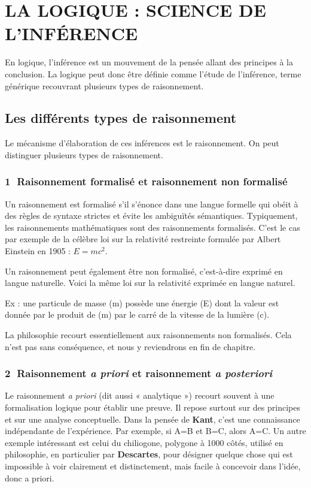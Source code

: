 \section{LA LOGIQUE : SCIENCE DE L’INFÉRENCE}
En logique, l’inférence est un mouvement de la pensée allant des principes à la conclusion. La logique peut donc être définie comme l’étude de l’inférence, terme générique recouvrant plusieurs types de raisonnement.

\subsection{Les différents types de raisonnement}
Le mécanisme d’élaboration de ces inférences est le raisonnement. On peut distinguer plusieurs types de raisonnement.

\subsubsection*{\textcircled{\scriptsize 1} Raisonnement formalisé et raisonnement non formalisé}
Un raisonnement est formalisé s’il s’énonce dans une langue formelle qui obéit à des règles
de syntaxe strictes et évite les ambiguïtés sémantiques. Typiquement, les raisonnements mathématiques sont des raisonnements formalisés. C’est le cas par exemple de la célèbre loi sur la relativité restreinte formulée par Albert Einstein en 1905 : $E=mc^2$.

Un raisonnement peut également être non formalisé, c’est-à-dire exprimé en langue naturelle. Voici la même loi sur la relativité exprimée en langue naturel.

Ex : une particule de masse (m) possède une énergie (E) dont la valeur est donnée par le produit de (m) par le carré de la vitesse de la lumière (c).

La philosophie recourt essentiellement aux raisonnements non formalisés. Cela n’est pas sans conséquence, et nous y reviendrons en fin de chapitre.

\subsubsection*{\textcircled{\scriptsize 2} Raisonnement \textit{a priori} et raisonnement \textit{a posteriori}}
Le raisonnement \textit{a priori} (dit aussi « analytique ») recourt souvent à une formalisation logique pour établir une preuve. Il repose surtout sur des principes et sur une analyse conceptuelle. Dans la pensée de \textbf{Kant}, c’est une connaissance indépendante de l’expérience. Par exemple, si A=B et B=C, alors A=C. Un autre exemple intéressant est celui du chiliogone, polygone à 1000 côtés, utilisé en philosophie, en particulier par \textbf{Descartes}, pour désigner quelque chose qui est impossible à voir clairement et distinctement, mais facile à concevoir dans l’idée, donc a priori.

